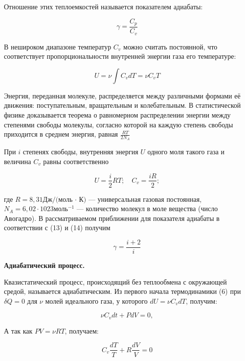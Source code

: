 \documentclass[10pt]{article}
\begin{document}
    Отношение этих теплоемкостей называется показателем адиабаты:

    \begin{equation}
        \gamma = \frac{C_p}{C_v}
    \end{equation}

    В нешироком диапазоне температур $C_v$ можно считать постоянной, что соответствует пропорциональности внутренней энергии газа его температуре:

    \begin{equation}
        U = \nu \int C_v dT = \nu C_v T
    \end{equation}

    Энергия, переданная молекуле, распределяется между различными формами её движения: поступательным, вращательным и колебательным. В статистической физике доказывается теорема о равномерном распределении энергии между степенями свободы молекулы, согласно которой на каждую степень свободы приходится в среднем энергия, равная $\frac{RT}{2 N_A}$

    При $i$ степенях свободы, внутренняя энергия $U$ одного моля такого газа и величина $C_v$ равны соответственно

    \begin{equation}
        U = \frac{i}{2}RT; \quad C_v = \frac{iR}{2}; 
    \end{equation}

    где $R = 8,31 \text{Дж}/\text{(моль · К)}$ — универсальная газовая постоянная, $N_A = 6,02 · 1023 \text{моль}^{−1}$ — количество молекул в моле вещества (число Авогадро).
    В рассматриваемом приближении для показателя адиабаты в соответствии с (13) и (14) получим

    \begin{equation}
        \gamma = \frac{i+2}{i}
    \end{equation}

    \textbf{Адиабатический процесс.}

    Квазистатический процесс, происходящий без теплообмена с окружающей средой, называется адиабатическим.
    Из первого начала термодинамики (6) при $\delta Q = 0$ для $\nu$ молей идеального газа, у которого $dU = \nu C_v dT$, получим:

    \begin{equation}
        \nu C_v dt + P dV = 0,
    \end{equation}

    А так как $PV = \nu RT$, получаем: 

    \begin{equation}
        C_v \frac{dT}{T} + R \frac{dV}{V} = 0
    \end{equation}
\end{document}
